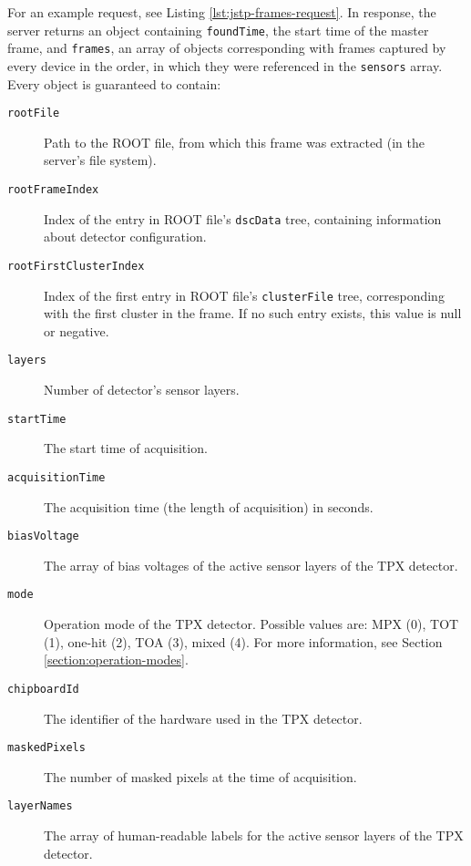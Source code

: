 For an example request, see Listing \ref{lst:jstp-frames-request}. In response, the server returns an object containing \texttt{foundTime}, the start time of the master frame, and \texttt{frames}, an array of objects corresponding with frames captured by every device in the order, in which they were referenced in the \texttt{sensors} array. Every object is guaranteed to contain:
~
\begin{description}
	\item[\texttt{rootFile}]
	Path to the ROOT file, from which this frame was extracted (in the server's file system).

	\item[\texttt{rootFrameIndex}]
	Index of the entry in ROOT file's \texttt{dscData} tree, containing information about detector configuration.

	\item[\texttt{rootFirstClusterIndex}]
	Index of the first entry in ROOT file's \texttt{clusterFile} tree, corresponding with the first cluster in the frame. If no such entry exists, this value is null or negative.

	\item[\texttt{layers}]
	Number of detector's sensor layers.

	\item[\texttt{startTime}]
	The start time of acquisition.

	\item[\texttt{acquisitionTime}]
	The acquisition time (the length of acquisition) in seconds.

	\item[\texttt{biasVoltage}]
	The array of bias voltages of the active sensor layers of the TPX detector.

	\item[\texttt{mode}]
	Operation mode of the TPX detector. Possible values are: MPX (0), TOT (1), one-hit (2), TOA (3), mixed (4). For more information, see Section \ref{section:operation-modes}.

	\item[\texttt{chipboardId}]
	The identifier of the hardware used in the TPX detector.

	\item[\texttt{maskedPixels}]
	The number of masked pixels at the time of acquisition.

	\item[\texttt{layerNames}]
	The array of human-readable labels for the active sensor layers of the TPX detector.


\end{description}
